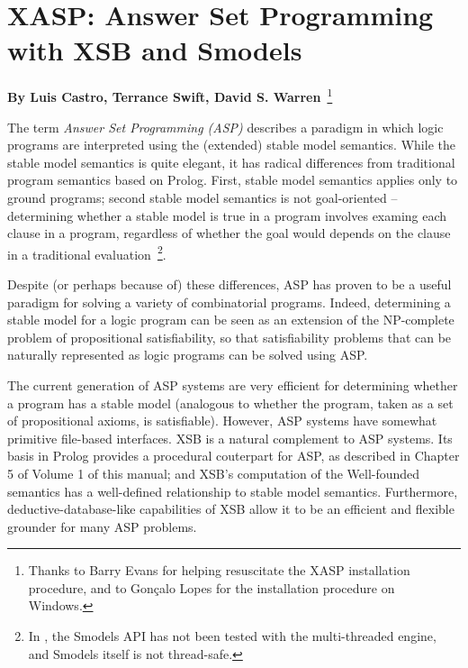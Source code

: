\chapter{XASP: Answer Set Programming with XSB and Smodels}
\label{xasp}

\begin{center}
{\Large {\bf By Luis Castro, Terrance Swift, David
    S. Warren}~\footnote{ Thanks to Barry Evans for helping
    resuscitate the XASP installation procedure, and to Gon\c{c}alo Lopes
    for the installation procedure on Windows.}}
\end{center}

The term {\em Answer Set Programming (ASP)} describes a paradigm in
which logic programs are interpreted using the (extended) stable model
semantics.  While the stable model semantics is quite elegant, it has
radical differences from traditional program semantics based on
Prolog.  First, stable model semantics applies only to ground
programs; second stable model semantics is not goal-oriented --
determining whether a stable model is true in a program involves
examing each clause in a program, regardless of whether the goal would
depends on the clause in a traditional evaluation~\footnote{In
  \version{}, the Smodels API has not been tested with the
  multi-threaded engine, and Smodels itself is not thread-safe.}.

Despite (or perhaps because of) these differences, ASP has proven to
be a useful paradigm for solving a variety of combinatorial programs.
Indeed, determining a stable model for a logic program can be seen as
an extension of the NP-complete problem of propositional
satisfiability, so that satisfiability problems that can be naturally
represented as logic programs can be solved using ASP.  

The current generation of ASP systems are very efficient for
determining whether a program has a stable model (analogous to whether
the program, taken as a set of propositional axioms, is satisfiable).
However, ASP systems have somewhat primitive file-based interfaces.
XSB is a natural complement to ASP systems.  Its basis in Prolog
provides a procedural couterpart for ASP, as described in Chapter 5 of
Volume 1 of this manual; and XSB's computation of the Well-founded
semantics has a well-defined relationship to stable model semantics.
Furthermore, deductive-database-like capabilities of XSB allow it to
be an efficient and flexible grounder for many ASP problems.

